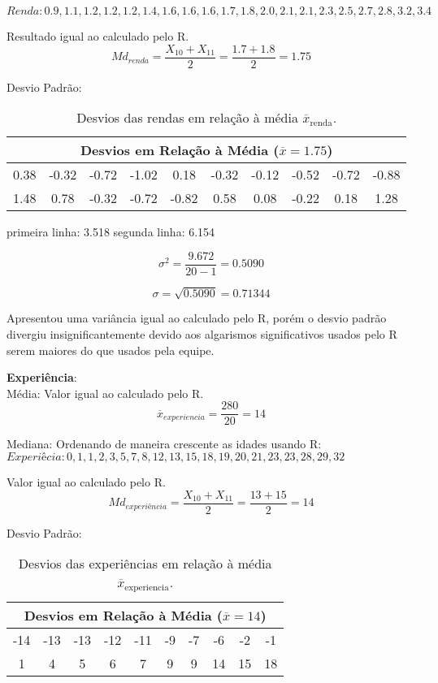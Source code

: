 \documentclass[a4paper,11pt]{article}
\begin{document}
\begin{description}[leftmargin=*]
$Renda: 0.9, 1.1, 1.2, 1.2, 1.2, 1.4, 1.6, 1.6, 1.6, 1.7, 1.8, 2.0, 2.1, 2.1, 2.3, 2.5, 2.7, 2.8, 3.2, 3.4$

Resultado igual ao calculado pelo R.
\[Md_{renda} = \frac{X_{10}+X_{11}}{2} = \frac{1.7+1.8}{2} = 1.75\]

Desvio Padrão:

\begin{table}[H]
    \centering
    \begin{tabular}{cccccccccc}
        \hline
        \multicolumn{10}{c}{\textbf{Desvios em Relação à Média ($\overline{x} = 1.75$)}}\\
        \hline
        0.38 & -0.32 & -0.72 & -1.02 & 0.18 & -0.32 & -0.12 & -0.52 & -0.72 & -0.88 \\ 
         1.48 & 0.78 & -0.32 & -0.72 & -0.82 & 0.58 & 0.08 & -0.22 & 0.18 & 1.28 \\
        \hline
    \end{tabular}
    \caption{Desvios das rendas em relação à média $\overline{x}_{\text{renda}}$.}
    \label{tab:desvios_renda}
\end{table}

primeira linha: 3.518
segunda linha: 6.154

\[\sigma^2 = \frac{ 9.672}{20-1} = 0.5090\]

\[\sigma = \sqrt{0.5090} = 0.71344\]

Apresentou uma variância igual ao calculado pelo R, porém o desvio padrão divergiu insignificantemente devido aos algarismos significativos usados pelo R serem maiores do que usados pela equipe.


\item \textbf{Experiência}:\\
Média:
Valor igual ao calculado pelo R.
\[\overline{x}_{experiencia} = \frac{280}{20} = 14\]

Mediana:
Ordenando de maneira crescente as idades usando R: \\
$Experiêcia: 0,  1,  1,  2,  3,  5,  7,  8, 12, 13, 15, 18, 19, 20, 21, 23, 23, 28, 29, 32$

Valor igual ao calculado pelo R.
\[Md_{experiência} = \frac{X_{10}+X_{11}}{2} = \frac{13+15}{2} = 14\]


Desvio Padrão:

\begin{table}[H]
    \centering
    \begin{tabular}{cccccccccc}
        \hline
        \multicolumn{10}{c}{\textbf{Desvios em Relação à Média ($\overline{x} = 14$)}}\\
        \hline
        -14 & -13 & -13 & -12 & -11 & -9 & -7 & -6 & -2 & -1 \\ 
         1 & 4 & 5 & 6 & 7 & 9 & 9 & 14 & 15 & 18 \\
        \hline
    \end{tabular}
    \caption{Desvios das experiências em relação à média $\overline{x}_{\text{experiencia}}$.}
    \label{tab:desvios_experiencia}
\end{table}



\end{description}
\end{document}
